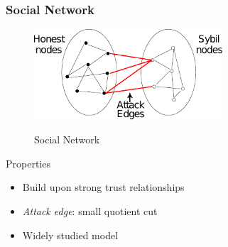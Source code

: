 \documentclass{beamer}
\begin{document}
\begin{frame}

  \frametitle{Social Network}
  
  \begin{figure}
    \includegraphics[width=7cm]{./pictures/social_network} \\
    \caption{Social Network}
  \end{figure}

  \begin{block}{Properties}

    \begin{itemize}
    \item Build upon strong trust relationships
    \item \emph{Attack edge}: small quotient cut
    \item Widely studied model
    \end{itemize}

  \end{block}

\end{frame}

\end{document}
